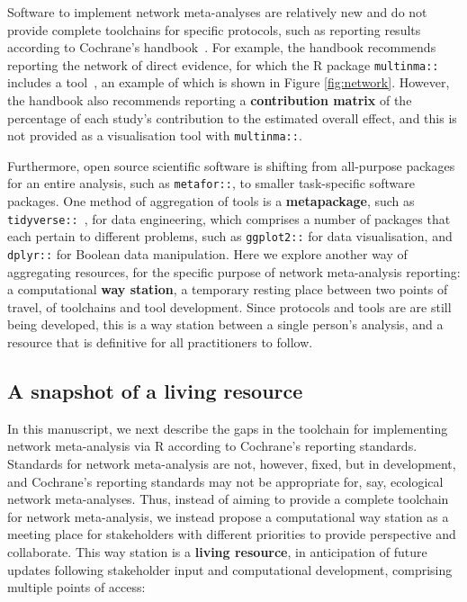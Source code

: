 \documentclass[12pt]{article}\usepackage[]{graphicx}\usepackage[]{color}
\newcommand{\package}[1]{\texttt{{#1::}}}
\begin{document}
Software to implement network meta-analyses are relatively new and do not provide complete toolchains for specific protocols, such as reporting results according to Cochrane's handbook~\cite{higgins2019cochrane}. For example, the handbook recommends reporting the network of direct evidence, for which the R package \package{multinma} includes a tool~\cite{phillippo_multinma_2020}, an example of which is shown in Figure \ref{fig:network}. However, the handbook also recommends reporting a \textbf{contribution matrix} of the percentage of each study's contribution to the estimated overall effect, and this is not provided as a visualisation tool with \package{multinma}.

Furthermore, open source scientific software is shifting from all-purpose packages for an entire analysis, such as \package{metafor}, to smaller task-specific software packages. One method of aggregation of tools is a \textbf{metapackage}, such as \package{tidyverse}~\cite{wickham_tidyverse_2017}, for data engineering, which comprises a number of packages that each pertain to different problems, such as \package{ggplot2} for data visualisation, and \package{dplyr} for Boolean data manipulation. Here we explore another way of aggregating resources, for the specific purpose of network meta-analysis reporting: a computational \textbf{way station}, a temporary resting place between two points of travel, of toolchains and tool development. Since protocols and tools are are still being developed, this is a way station between a single person's analysis, and a resource that is definitive for all practitioners to follow.

\subsection{A snapshot of a living resource}

In this manuscript, we next describe the gaps in the toolchain for implementing network meta-analysis via R according to Cochrane's reporting standards. Standards for network meta-analysis are not, however, fixed, but in development, and Cochrane's reporting standards may not be appropriate for, say, ecological network meta-analyses. Thus, instead of aiming to provide a complete toolchain for network meta-analysis, we instead propose a computational way station as a meeting place for stakeholders with different priorities to provide perspective and collaborate. This way station is a \textbf{living resource}, in anticipation of future updates following stakeholder input and computational development, comprising multiple points of access:
\end{document}
